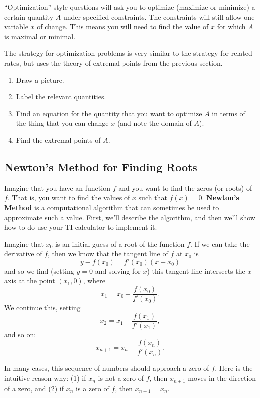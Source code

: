 ``Optimization''-style questions will ask you to optimize (maximize or minimize) a certain quantity $A$ under specified constraints. The constraints will still allow one variable $x$ of change. This means you will need to find the value of $x$ for which $A$ is maximal or minimal. 

The strategy for optimization problems is very similar to the strategy for related rates, but uses the theory of extremal points from the previous section.

\begin{strat}[Optimization]
\begin{enumerate}[leftmargin=1em]
\item Draw a picture.
\item Label the relevant quantities.
\item Find an equation for the quantity that you want to optimize $A$ in terms of the thing that you can change $x$ (and note the domain of $A$).
\item Find the extremal points of $A$.
\end{enumerate}
\end{strat}


\subsection{Newton's Method for Finding Roots}

Imagine that you have an function $f$ and you want to find the zeros (or roots) of $f$. That is, you want to find the values of $x$ such that $f(x)=0$. \textbf{Newton's Method} is a computational algorithm that can sometimes be used to approximate such a value. First, we'll describe the algorithm, and then we'll show how to do use your TI calculator to implement it.

Imagine that $x_0$ is an initial guess of a root of the function $f$. If we can take the derivative of $f$, then we know that the tangent line of $f$ at $x_0$ is
$$y-f(x_0)=f'(x_0)(x-x_0)$$
and so we find (setting $y=0$ and solving for $x$) this tangent line intersects the $x$-axis at the point $(x_1,0)$, where
$$x_1=x_0-\frac{f(x_0)}{f'(x_0)}.$$
We continue this, setting
$$x_2=x_1-\frac{f(x_1)}{f'(x_1)},$$
and so on:
$$x_{n+1}=x_n-\frac{f(x_n)}{f'(x_n)}.$$

In many cases, this sequence of numbers should approach a zero of $f$. Here is the intuitive reason why: (1) if $x_n$ is not a zero of $f$, then $x_{n+1}$ moves in the direction of a zero, and (2) if $x_n$ is a zero of $f$, then $x_{n+1}=x_n$.

